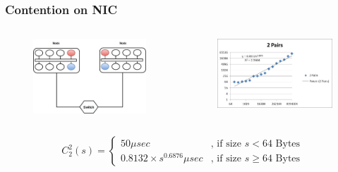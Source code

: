 \documentclass{beamer}
\begin{document}
\begin{frame}
\frametitle{Contention on NIC}
\begin{columns}[c]

\begin{figure}
\includegraphics[width=\linewidth,height=\textheight,keepaspectratio]{nodes2p2.jpg}
\end{figure}

\begin{figure}
\includegraphics[width=\linewidth,height=\textheight,keepaspectratio]{picture1.jpg}
\end{figure}


\end{columns}

\begin{block}{}
\begin{equation*}
C_2 ^2(s)=\begin{cases}
50 \mu sec & \text{, if size }s < 64 \text{ Bytes} \\
0.8132\times s^{0.6876} \mu sec & \text{, if size } s \geq 64 \text{ Bytes}
\end{cases}
\end{equation*}
\end{block}

\end{frame}
\end{document}
